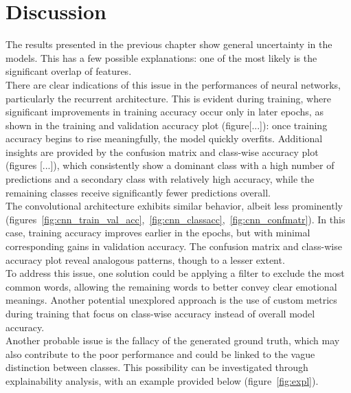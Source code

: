 \chapter*{Discussion}
\label{ch:discussion}
The results presented in the previous chapter show general
uncertainty in the models. This has a few possible explanations:
one of the most likely is the significant overlap of features.\\

There are clear indications of this issue in the performances of neural networks,
particularly the recurrent architecture. This is evident during training, where
significant improvements in training accuracy occur only in later epochs, as shown
in the training and validation accuracy plot (figure[...]):
once training accuracy begins to rise meaningfully, the model quickly overfits.
Additional insights are provided by the confusion matrix and class-wise accuracy
plot (figures [...]), which consistently
show a dominant class with a high number of predictions and a secondary class
with relatively high accuracy, while the remaining classes receive significantly
fewer predictions overall.\\

The convolutional architecture exhibits similar behavior, albeit less prominently
(figures~\ref{fig:cnn_train_val_acc},~\ref{fig:cnn_classacc},~\ref{fig:cnn_confmatr}).
In this case, training accuracy improves earlier in the epochs,
but with minimal corresponding gains in validation accuracy.
The confusion matrix and class-wise accuracy plot reveal analogous patterns, though
to a lesser extent.\\

To address this issue, one solution could be applying a filter to exclude the most
common words, allowing the remaining words to better convey clear emotional
meanings. Another potential unexplored approach is the use of custom
metrics during training that focus on class-wise accuracy instead of overall model
accuracy.\\

Another probable issue is the fallacy of the generated ground truth, which may
also contribute to the poor performance and could be linked to the vague distinction
between classes.
This possibility can be investigated through explainability analysis, with an
example provided below (figure~\ref{fig:expl}).

